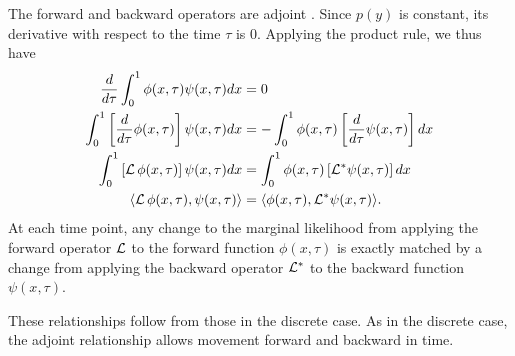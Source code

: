 \documentclass[preprint]{elsarticle}
\newcommand\eg{{\it e.g.,}}
\begin{document}
The forward and backward operators are adjoint \citep[\eg][]{Durr08}. Since $p(y)$ is constant, its derivative with respect to the time $\tau$ is $0$. Applying the product rule, we thus have
\begin{equation}\label{eq:adjoint_continuous}
\begin{split}
\frac{d}{d\tau}\int_{0}^{1} \phi(x,\tau) \psi(x,\tau)dx &= 0\\
\int_{0}^{1} \left[\frac{d}{d\tau} \phi(x,\tau)\right] \psi(x,\tau)dx &= -\int_{0}^{1} \phi(x,\tau) \left[\frac{d}{d\tau} \psi(x,\tau)\right] dx\\
\int_{0}^{1} \left[{\cal L}\,\phi(x,\tau)\right] \psi(x,\tau)dx &= \int_{0}^{1}  \phi(x,\tau) \left[{\cal L}^{*} \psi(x,\tau)\right] dx\\
\langle{\cal L}\,\phi(x,\tau), \psi(x,\tau)\rangle &= \langle \phi(x,\tau),{\cal L}^{*} \psi(x,\tau)\rangle.
\end{split}
\end{equation}
At each time point, any change to the marginal likelihood from applying the forward operator ${\cal L}$ to the forward function $\phi(x,\tau)$ is exactly matched by a change from applying the backward operator ${\cal L}^{*}$ to the backward function $\psi(x,\tau)$. 

These relationships follow from those in the discrete case. As in the discrete case, the adjoint relationship allows movement forward and backward in time. 
\end{document}
